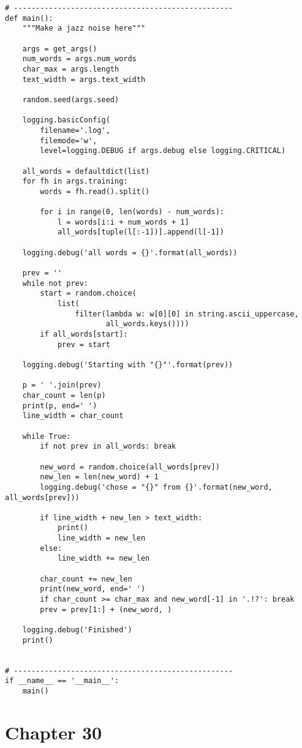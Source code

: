 \documentclass[]{article}
\begin{document}
\begin{verbatim}
# --------------------------------------------------
def main():
    """Make a jazz noise here"""

    args = get_args()
    num_words = args.num_words
    char_max = args.length
    text_width = args.text_width

    random.seed(args.seed)

    logging.basicConfig(
        filename='.log',
        filemode='w',
        level=logging.DEBUG if args.debug else logging.CRITICAL)

    all_words = defaultdict(list)
    for fh in args.training:
        words = fh.read().split()

        for i in range(0, len(words) - num_words):
            l = words[i:i + num_words + 1]
            all_words[tuple(l[:-1])].append(l[-1])

    logging.debug('all words = {}'.format(all_words))

    prev = ''
    while not prev:
        start = random.choice(
            list(
                filter(lambda w: w[0][0] in string.ascii_uppercase,
                       all_words.keys())))
        if all_words[start]:
            prev = start

    logging.debug('Starting with "{}"'.format(prev))

    p = ' '.join(prev)
    char_count = len(p)
    print(p, end=' ')
    line_width = char_count

    while True:
        if not prev in all_words: break

        new_word = random.choice(all_words[prev])
        new_len = len(new_word) + 1
        logging.debug('chose = "{}" from {}'.format(new_word, all_words[prev]))

        if line_width + new_len > text_width:
            print()
            line_width = new_len
        else:
            line_width += new_len

        char_count += new_len
        print(new_word, end=' ')
        if char_count >= char_max and new_word[-1] in '.!?': break
        prev = prev[1:] + (new_word, )

    logging.debug('Finished')
    print()


# --------------------------------------------------
if __name__ == '__main__':
    main()
\end{verbatim}

\pagebreak

\hypertarget{chapter-30}{%
\section{Chapter 30}\label{chapter-30}}
\end{document}
